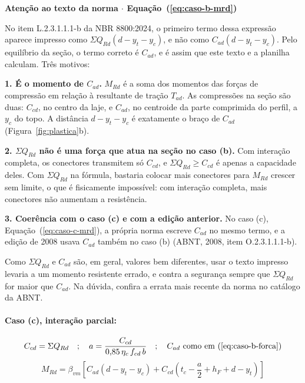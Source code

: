 \documentclass[11pt,a4paper]{article}
\newcommand{\caixaconceito}[2]{%
  \par\vspace{6pt}\noindent\colorbox{calloutbg}{%
    \parbox{\dimexpr\linewidth-2\fboxsep\relax}{%
      \vspace{4pt}\textbf{\color{primary}#1}\par\vspace{3pt}#2\vspace{4pt}%
    }%
  }\par\vspace{6pt}%
}
\begin{document}
\caixaconceito{Atenção ao texto da norma $\cdot$ Equação~(\ref{eq:caso-b-mrd})}{%
No item L.2.3.1.1.1-b da NBR 8800:2024, o primeiro termo dessa expressão aparece impresso como $\Sigma Q_{Rd}(d - y_t - y_c)$, e não como $C_{ad}(d - y_t - y_c)$. Pelo equilíbrio da seção, o termo correto é $C_{ad}$, e é assim que este texto e a planilha calculam. Três motivos:\par\vspace{4pt}
\textbf{1. É o momento de $C_{ad}$.} $M_{Rd}$ é a soma dos momentos das forças de compressão em relação à resultante de tração $T_{ad}$. As compressões na seção são duas: $C_{cd}$, no centro da laje, e $C_{ad}$, no centroide da parte comprimida do perfil, a $y_c$ do topo. A distância $d - y_t - y_c$ é exatamente o braço de $C_{ad}$ (Figura~\ref{fig:plastica}b).\par
\textbf{2. $\Sigma Q_{Rd}$ não é uma força que atua na seção no caso (b).} Com interação completa, os conectores transmitem só $C_{cd}$, e $\Sigma Q_{Rd} \ge C_{cd}$ é apenas a capacidade deles. Com $\Sigma Q_{Rd}$ na fórmula, bastaria colocar mais conectores para $M_{Rd}$ crescer sem limite, o que é fisicamente impossível: com interação completa, mais conectores não aumentam a resistência.\par
\textbf{3. Coerência com o caso (c) e com a edição anterior.} No caso (c), Equação~(\ref{eq:caso-c-mrd}), a própria norma escreve $C_{ad}$ no mesmo termo, e a edição de 2008 usava $C_{ad}$ também no caso (b) (ABNT, 2008, item O.2.3.1.1.1-b).\par\vspace{4pt}
Como $\Sigma Q_{Rd}$ e $C_{ad}$ são, em geral, valores bem diferentes, usar o texto impresso levaria a um momento resistente errado, e contra a segurança sempre que $\Sigma Q_{Rd}$ for maior que $C_{ad}$. Na dúvida, confira a errata mais recente da norma no catálogo da ABNT.}

\paragraph{Caso (c), interação parcial:}
\begin{equation}
  C_{cd} = \Sigma Q_{Rd} \quad ; \quad a = \frac{C_{cd}}{0{,}85\,\eta_c\,f_{cd}\,b} \quad ; \quad C_{ad}\text{ como em (\ref{eq:caso-b-forca})}
  \label{eq:caso-c-forca}
\end{equation}
\begin{equation}
  M_{Rd} = \beta_{vm}\left[C_{ad}(d - y_t - y_c) + C_{cd}\left(t_c - \frac{a}{2} + h_F + d - y_t\right)\right]
  \label{eq:caso-c-mrd}
\end{equation}
\end{document}
